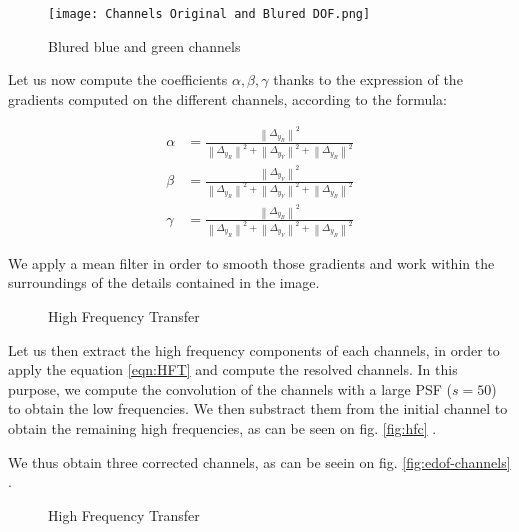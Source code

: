 \documentclass[10pt,letterpaper]{article}
\begin{document}
\begin{figure}[h]
	\centering
	\texttt{[image: Channels Original and Blured DOF.png]}
	\caption{Blured blue and green channels}
	\label{fig:blured-channels}
\end{figure}

Let us now compute the coefficients $\alpha,\beta,\gamma$ thanks to the expression of the gradients computed on the different channels, according to the formula:

$$
\begin{aligned}
\alpha & =\frac{\left\|\Delta_{y_R}\right\|^2}{\left\|\Delta_{y_R}\right\|^2+\left\|\Delta_{y_V}\right\|^2+\left\|\Delta_{y_B}\right\|^2} \\ 
\beta & =\frac{\left\|\Delta_{y_V}\right\|^2}{\left\|\Delta_{y_R}\right\|^2+\left\|\Delta_{y_V}\right\|^2+\left\|\Delta_{y_B}\right\|^2} \\ 
\gamma & =\frac{\left\|\Delta_{y_B}\right\|^2}{\left\|\Delta_{y_R}\right\|^2+\left\|\Delta_{y_V}\right\|^2+\left\|\Delta_{y_B}\right\|^2}\end{aligned}
$$

We apply a mean filter in order to smooth those gradients and work within the surroundings of the details contained in the image.

\begin{figure}[h]
    \centering
	\caption{High Frequency Transfer}
\end{figure}

Let us then extract the high frequency components of each channels, in order to apply the equation \ref{eqn:HFT} and compute the resolved channels. In this purpose, we compute the convolution of the channels with a large PSF ($s = 50$) to obtain the low frequencies.  We then substract them from the initial channel to obtain the remaining high frequencies, as can be seen on fig. \ref{fig:hfc} .

We thus obtain three corrected channels, as can be seein on fig. \ref{fig:edof-channels} .

\begin{figure}[h]
    \centering
	\caption{High Frequency Transfer}
\end{figure}
\end{document}
